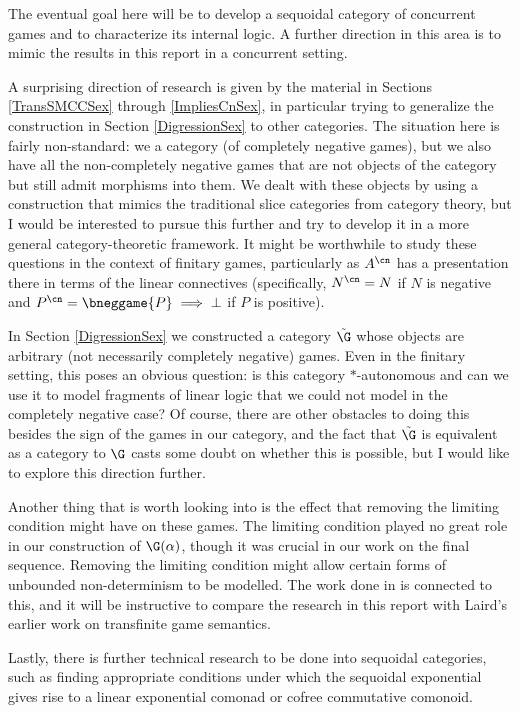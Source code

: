 \documentclass[11pt]{article} %
\begin{document}
The eventual goal here will be to develop a sequoidal category of concurrent games and to characterize its internal logic.  A further direction in this area is to mimic the results in this report in a concurrent setting.  

A surprising direction of research is given by the material in Sections \ref{TransSMCCSex} through \ref{ImpliesCnSex}, in particular trying to generalize the construction in Section \ref{DigressionSex} to other categories.  The situation here is fairly non-standard: we a category (of completely negative games), but we also have all the non-completely negative games that are not objects of the category but still admit morphisms into them.  We dealt with these objects by using a construction that mimics the traditional slice categories from category theory, but I would be interested to pursue this further and try to develop it in a more general category-theoretic framework.  It might be worthwhile to study these questions in the context of finitary games, particularly as $A^{\cn}$ has a presentation there in terms of the linear connectives (specifically, $N^{\cn}=N$ if $N$ is negative and $P^{\cn}=\bneggame{P}\implies\bot$ if $P$ is positive).  

In Section \ref{DigressionSex} we constructed a category $\tilde{\G}$ whose objects are arbitrary (not necessarily completely negative) games.  Even in the finitary setting, this poses an obvious question: is this category  $*$-autonomous and can we use it to model fragments of linear logic that we could not model in the completely negative case?  Of course, there are other obstacles to doing this besides the sign of the games in our category, and the fact that $\tilde{\G}$ is equivalent as a category to $\G$ casts some doubt on whether this is possible, but I would like to explore this direction further.  

Another thing that is worth looking into is the effect that removing the limiting condition might have on these games.  The limiting condition played no great role in our construction of $\G(\alpha)$, though it was crucial in our work on the final sequence.  Removing the limiting condition might allow certain forms of unbounded non-determinism to be modelled.  The work done in \cite{LairdOrdinalGames} is connected to this, and it will be instructive to compare the research in this report with Laird's earlier work on transfinite game semantics.  

Lastly, there is further technical research to be done into sequoidal categories, such as finding appropriate conditions under which the sequoidal exponential gives rise to a linear exponential comonad or cofree commutative comonoid.  
\end{document}
